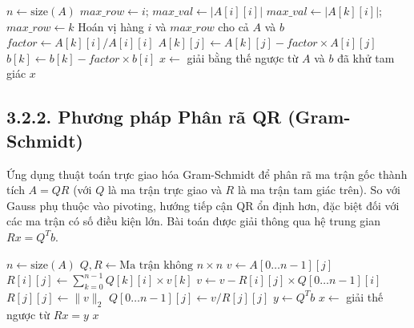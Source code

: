 \begin{algorithm}[H]
\caption{Giải hệ phương trình bằng Khử Gauss (Partial Pivoting)}
\label{alg:gauss_pivoting}
\begin{algorithmic}[1]
    \State $n \gets \text{size}(A)$
        \State $max\_row \gets i$; $max\_val \gets |A[i][i]|$
         
                \State $max\_val \gets |A[k][i]|$; $max\_row \gets k$
            \EndIf
        \EndFor
        \State Hoán vị hàng $i$ và $max\_row$ cho cả $A$ và $b$
         
            \State $factor \gets A[k][i] / A[i][i]$
                \State $A[k][j] \gets A[k][j] - factor \times A[i][j]$
            \EndFor
            \State $b[k] \gets b[k] - factor \times b[i]$
        \EndFor
    \EndFor
    \State $x \gets$ giải bằng thế ngược từ $A$ và $b$ đã khử tam giác
    \State \Return $x$
\EndProcedure
\end{algorithmic}
\end{algorithm}

\subsection*{3.2.2. Phương pháp Phân rã QR (Gram-Schmidt)}
{}

Ứng dụng thuật toán trực giao hóa Gram-Schmidt để phân rã ma trận gốc thành tích $A = QR$ (với $Q$ là ma trận trực giao và $R$ là ma trận tam giác trên). So với Gauss phụ thuộc vào pivoting, hướng tiếp cận QR ổn định hơn, đặc biệt đối với các ma trận có số điều kiện lớn. Bài toán được giải thông qua hệ trung gian $Rx = Q^Tb$.

\begin{algorithm}[H]
\caption{Giải hệ phương trình bằng Phân rã QR (Gram-Schmidt)}
\label{alg:solve_qr}
\begin{algorithmic}[1]
    \State $n \gets \text{size}(A)$
    \State $Q, R \gets \text{Ma trận không } n \times n$
     
        \State $v \gets A[0 \dots n-1][j]$
            \State $R[i][j] \gets \sum_{k=0}^{n-1} Q[k][i] \times v[k]$
            \State $v \gets v - R[i][j] \times Q[0 \dots n-1][i]$
        \EndFor
        \State $R[j][j] \gets \|v\|_2$
        \State $Q[0 \dots n-1][j] \gets v / R[j][j]$
    \EndFor
    \State $y \gets Q^T b$
    \State $x \gets$ giải thế ngược từ $Rx = y$
    \State \Return $x$
\EndProcedure
\end{algorithmic}
\end{algorithm}

